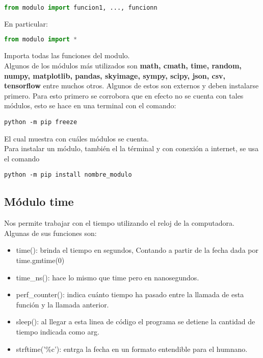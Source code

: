 \documentclass[10pt,oneside]{article}
\begin{document}
\begin{multicols}{2}
                \begin{lstlisting}[language=Python]
from modulo import funcion1, ..., funcionn       
                \end{lstlisting}

                En particular:

                \begin{lstlisting}[language=Python]
from modulo import *       
                \end{lstlisting}
                
                Importa todas las funciones del modulo.\\ \newline Algunos de los módulos más utilizados son \textbf{math, cmath, time, random, numpy, matplotlib, pandas, skyimage, sympy, scipy, json, csv, tensorflow} entre muchos otros. Algunos de estos son externos y deben instalarse primero. Para esto primero se corrobora que en efecto no se cuenta con tales módulos, esto se hace en una terminal con el comando:

                \begin{verbatim}
python -m pip freeze
                \end{verbatim}
                El cual muestra con cuáles módulos se cuenta. \\ \newline Para instalar un módulo, también el la términal y con conexión a internet, se usa el comando 

                \begin{verbatim}
python -m pip install nombre_modulo                    
                \end{verbatim}

                \subsection{Módulo time}
                    Nos permite trabajar con el tiempo utilizando el reloj de la computadora. Algunas de sus funciones son:
                    \begin{itemize}
                        \item time(): brinda el tiempo en segundos, Contando a partir de la fecha dada por time.gmtime(0)
                        \item time\_ns(): hace lo mismo que time pero en nanosegundos.
                        \item perf\_counter(): indica cuánto tiempo ha pasado entre la llamada de esta función y la llamada anterior.
                        \item sleep(): al llegar a esta linea de código el programa se detiene la cantidad de tiempo indicada como arg.
                        \item strftime('\%c'): entrga la fecha en un formato entendible para el humnano.
                    \end{itemize}


\end{multicols}
\end{document}
